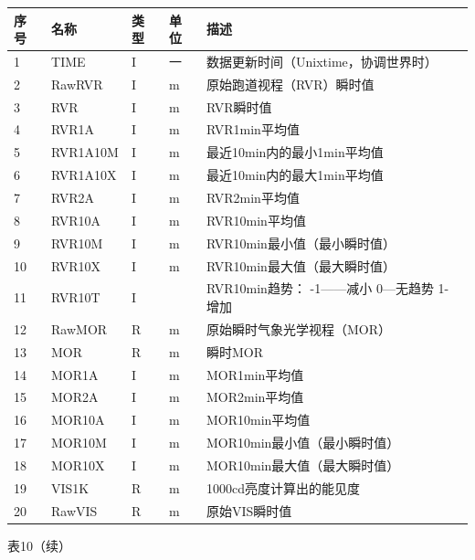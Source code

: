 \documentclass[
  10
]{article}
\begin{document}
\begin{longtable}[]{@{}|l|l|l|l|l|@{}}
\toprule\noalign{}
\endhead
\bottomrule\noalign{}
\endlastfoot
\hline
序号 & 名称 & 类型 & 单位 & 描述 \\
\hline
1 & TIME & I & 一 & 数据更新时间（Unixtime，协调世界时） \\
\hline
2 & RawRVR & I & m & 原始跑道视程（RVR）瞬时值 \\
\hline
3 & RVR & I & m & RVR瞬时值 \\
\hline
4 & RVR1A & I & m & RVR1min平均值 \\
\hline
5 & RVR1A10M & I & m & 最近10min内的最小1min平均值 \\
\hline
6 & RVR1A10X & I & m & 最近10min内的最大1min平均值 \\
\hline
7 & RVR2A & I & m & RVR2min平均值 \\
\hline
8 & RVR10A & I & m & RVR10min平均值 \\
\hline
9 & RVR10M & I & m & RVR10min最小值（最小瞬时值） \\
\hline
10 & RVR10X & I & m & RVR10min最大值（最大瞬时值） \\
\hline
11 & RVR10T & I & & RVR10min趋势： -1------减小 0---无趋势 1-增加 \\
\hline
12 & RawMOR & R & m & 原始瞬时气象光学视程（MOR） \\
\hline
13 & MOR & R & m & 瞬时MOR \\
\hline
14 & MOR1A & I & m & MOR1min平均值 \\
\hline
15 & MOR2A & I & m & MOR2min平均值 \\
\hline
16 & MOR10A & I & m & MOR10min平均值 \\
\hline
17 & MOR10M & I & m & MOR10min最小值（最小瞬时值） \\
\hline
18 & MOR10X & I & m & MOR10min最大值（最大瞬时值） \\
\hline
19 & VIS1K & R & m & 1000cd亮度计算出的能见度 \\
\hline
20 & RawVIS & R & m & 原始VIS瞬时值 \\
\hline
\end{longtable}

表10（续）
\end{document}
